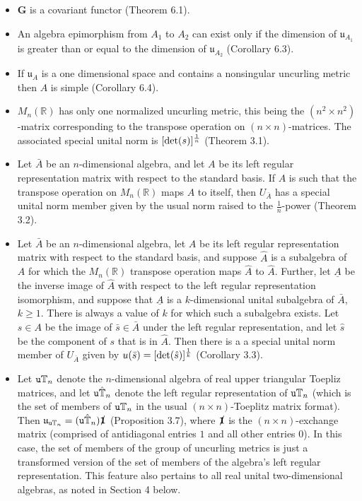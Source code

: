 \documentclass{amsart}
\numberwithin{equation}{section}
\theoremstyle{definition}
\numberwithin{theorem}{section}
\begin{document}
\begin{itemize} 
\item $\mathbf{G}$ is a covariant functor (Theorem 6.1).
\item An algebra epimorphism from $A_1$ to $A_2$ can exist only if the dimension of $\mathfrak{u}_{A_1}$ is greater than or equal to the dimension of $\mathfrak{u}_{A_2}$ (Corollary 6.3). 
\item If $\mathfrak{u}_A$ is a one dimensional space and contains a nonsingular uncurling metric then $A$ is simple (Corollary 6.4).
\item  $ M_n(\mathbb{R})$ has only one normalized uncurling metric, this being the $(n^2\times n^2)$-matrix corresponding to the  transpose operation on $(n\times n)$-matrices. The associated special unital norm is $[{\rm det}(s)]^{\frac{1}{n}}$ (Theorem 3.1). 
\item Let $\bar{A}$ be an $n$-dimensional algebra, and let $A$ be its left regular representation matrix with respect to the standard basis.  If $A$ is such that the transpose operation on $ M_n(\mathbb{R})$ maps $A$ to itself, then $ U_{\bar{A}}$ has a special unital norm member given by the usual norm raised to the $\frac{1}{n}$-power (Theorem 3.2).
\item Let $\bar{A}$ be an $n$-dimensional algebra, let $A$ be its left regular representation matrix with respect to the standard basis, and suppose $\hat{A}$ is a subalgebra of $A$ for which the $ M_n(\mathbb{R})$ transpose operation maps $\hat{A}$ to $\hat{A}$.  Further, let $\underline{A}$ be the inverse image of $\hat{A}$ with respect to the left regular representation isomorphism, and suppose that $\underline{A}$ is a $k$-dimensional unital subalgebra of $\bar{A}$, $k\ge 1$.  There is always a value of $k$ for which such a subalgebra exists.  Let $s\in A$ be the image of $\bar{s}\in \bar{A}$ under the left regular representation, and let $\hat{s}$ be the component of $s$ that is in $\hat{A}$.  Then there is a a special unital norm member of $ U_{\bar{A}}$ given by $ u(\bar{s}) = [\text{\rm det}(\hat{s})]^{\frac{1}{k}}$ (Corollary 3.3).
\item Let ${\tt u}\mathbb{T}_n$ denote the $n$-dimensional algebra of real upper triangular Toepliz matrices, and let ${\tt u}\hat{\mathbb{T}}_n$  denote the left regular representation of ${\tt u}\mathbb{T}_n$ (which is the set of members of ${\tt u}\mathbb{T}_n$ in the usual $(n\times n)$-Toeplitz matrix format).  Then $\mathfrak{u}_{{\tt u}\mathbb{T}_n} = ({\tt u}\hat{\mathbb{T}}_n)\slashed{\mathbf{1}}$ (Proposition 3.7), where $\slashed{\mathbf{1}}$ is the $(n\times n)$-exchange matrix (comprised of antidiagonal entries $1$ and all other entries $0$).  In this case, the set of members of the group of uncurling metrics is just a transformed version of the set of members of the algebra's left regular representation.  This feature also pertains to all real unital two-dimensional algebras, as noted in Section 4 below.

\end{itemize}
\end{document}
